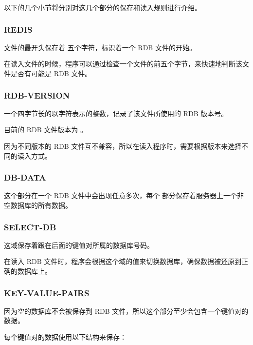 \documentclass[a4paper,11pt,english]{sphinxmanual}
\begin{document}
以下的几个小节将分别对这几个部分的保存和读入规则进行介绍。


\subsubsection{REDIS}
\label{internal/rdb:redis}
文件的最开头保存着  五个字符，标识着一个 RDB 文件的开始。

在读入文件的时候，程序可以通过检查一个文件的前五个字节，来快速地判断该文件是否有可能是 RDB 文件。


\subsubsection{RDB-VERSION}
\label{internal/rdb:rdb-version}
一个四字节长的以字符表示的整数，记录了该文件所使用的 RDB 版本号。

目前的 RDB 文件版本为  。

因为不同版本的 RDB 文件互不兼容，所以在读入程序时，需要根据版本来选择不同的读入方式。


\subsubsection{DB-DATA}
\label{internal/rdb:db-data}
这个部分在一个 RDB 文件中会出现任意多次，每个  部分保存着服务器上一个非空数据库的所有数据。


\subsubsection{SELECT-DB}
\label{internal/rdb:select-db}
这域保存着跟在后面的键值对所属的数据库号码。

在读入 RDB 文件时，程序会根据这个域的值来切换数据库，确保数据被还原到正确的数据库上。


\subsubsection{KEY-VALUE-PAIRS}
\label{internal/rdb:key-value-pairs}
因为空的数据库不会被保存到 RDB 文件，所以这个部分至少会包含一个键值对的数据。

每个键值对的数据使用以下结构来保存：
\end{document}
